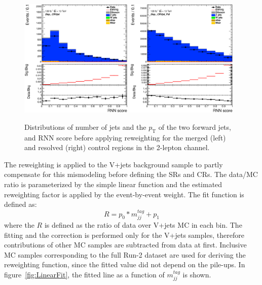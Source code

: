 \begin{figure}[ht]
    \includegraphics[width=0.48\textwidth]{figures/2lep/reweighting/before_reweighting/C_0ptag1pfat0pjet_0ptv_CRVjet_RNNScoreMerged_Lin.eps}
    \includegraphics[width=0.48\textwidth]{figures/2lep/reweighting/before_reweighting/C_0ptag2pjet_0ptv_CRVjet_Fid_RNNScoreResolved_Lin.eps}
    \caption{ Distributions of number of jets and the $p_\mathrm{T}$ of the two forward jets, and RNN score before applying reweighting for the merged (left) and resolved (right) control regions in the 2-lepton channel.}
    \label{fig:before_rw}
\end{figure}

The reweighting is applied to the V+jets background sample to partly compensate for this mismodeling before defining the SRs and CRs. 
The data/MC ratio is parameterized by the simple linear function and the estimated reweighting factor is applied by the event-by-event weight. 
The fit function is defined as:
\begin{equation}
\label{eqn:reweight}
R=p_{0} * m_{jj}^{tag}+p_{1}
\end{equation}
where the $R$ is defined as the ratio of data over V+jets MC in each bin.
The fitting and the correction is performed only for the V+jets samples, therefore contributions of other MC samples are subtracted from data at first. 
Inclusive MC samples corresponding to the full Run-2 dataset are used for deriving the reweighting function, since the fitted value did not depend on the pile-ups.
In figure~\ref{fig:LinearFit}, the fitted line as a function of $m^{tag}_{jj}$ is shown. 

